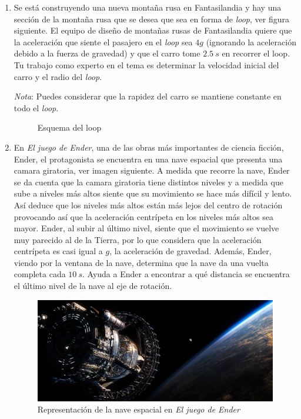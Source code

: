 \documentclass[letterpaper]{article}
\begin{document}
\begin{enumerate}

\item Se está construyendo una nueva montaña rusa en Fantasilandia y hay una sección de la montaña rusa que se desea que sea en forma de \emph{loop}, ver figura siguiente. El equipo de diseño de montañas rusas de Fantasilandia quiere que la aceleración que siente el pasajero en el \emph{loop} sea $4g$ (ignorando la aceleración debido a la fuerza de gravedad) y que el carro tome $2.5\ \si{s}$ en recorrer el loop. Tu trabajo como experto en el tema es determinar la velocidad inicial del carro y el radio del \emph{loop}.
 
\emph{Nota}: Puedes considerar que la rapidez del carro se mantiene constante en todo el \emph{loop}.

\begin{figure}[h]
\centering
{}
\caption{Esquema del loop}
\end{figure}
 
\item En \emph{El juego de Ender}, una de las obras más importantes de ciencia ficción, Ender, el protagonista se encuentra en una nave espacial que presenta una camara giratoria, ver imagen siguiente. A medida que recorre la nave, Ender se da cuenta que la camara giratoria tiene distintos niveles y a medida que sube a niveles más altos siente que su movimiento se hace más difícil y lento.  Así deduce que los niveles más altos están más lejos del centro de rotación provocando así que la aceleración centrípeta en los niveles más altos sea mayor. Ender, al subir al último nivel, siente que el movimiento se vuelve muy parecido al de la Tierra, por lo que considera que la aceleración centrípeta es casi igual a $g$, la aceleración de gravedad. Además, Ender, viendo por la ventana de la nave, determina que la nave da una vuelta completa cada $10\ \si{s}$. Ayuda a Ender a encontrar a qué distancia se encuentra el último nivel de la nave al eje de rotación.

\begin{figure}[h]
\centering
\includegraphics[scale=0.4]{ender.jpg}
\caption{Representación de la nave espacial en \emph{El juego de Ender}}
\end{figure}


\end{enumerate}
\end{document}
